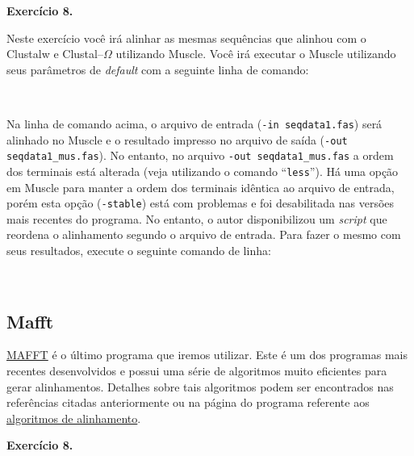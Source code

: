 \begin{refsection}
\begin{blackBlock}{\textbf{Exercício 8.}}\label{tut8:ex:8.4}

Neste exercício você irá alinhar as mesmas sequências que alinhou com o Clustalw e Clustal--$\Omega$ utilizando Muscle. Você irá executar o Muscle utilizando seus parâmetros de \textit{default} com a seguinte linha de comando:

\scriptsize
{}\\
\normalsize

\end{blackBlock}

Na linha de comando acima, o arquivo de entrada (\texttt{-in seqdata1.fas}) será alinhado no Muscle e o resultado impresso no arquivo de saída (\texttt{-out seqdata1\_mus.fas}). No entanto,  no arquivo \texttt{-out seqdata1\_mus.fas} a ordem dos terminais está alterada (veja utilizando o comando ``\texttt{less}''). Há uma opção em Muscle para manter a ordem dos terminais idêntica ao arquivo de entrada, porém esta opção (\texttt{-stable}) está com problemas e foi desabilitada nas versões mais recentes do programa. No entanto, o autor disponibilizou um \textit{script} que reordena o alinhamento segundo o arquivo de entrada. Para fazer o mesmo com seus resultados, execute o seguinte comando de linha: 

\scriptsize
{}\\
\normalsize

\subsection{Mafft}\label{tut8:msa:mafft}

\href{http://mafft.cbrc.jp/alignment/software/}{MAFFT} \parencite{Katoh_et_al_2002, Katoh_and_Standley_2013} é o último programa que iremos utilizar. Este é um dos programas mais recentes desenvolvidos e possui uma série de algoritmos muito eficientes para gerar alinhamentos. Detalhes sobre tais algoritmos podem ser encontrados nas referências citadas anteriormente ou na página do programa referente aos \href{http://mafft.cbrc.jp/alignment/software/algorithms/algorithms.html}{algoritmos de alinhamento}.\\


\begin{blackBlock}{\textbf{Exercício 8.}}\label{tut8:ex:8.5}


\end{blackBlock}
\end{refsection}
